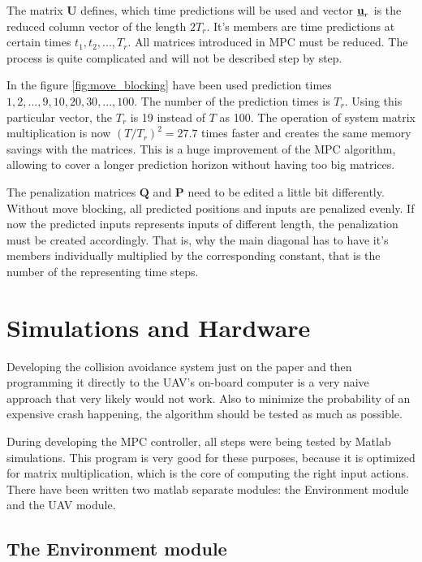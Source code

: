 \documentclass{article}
\newcommand{\urvec}{\textbf{\underline{u}}_r}
\newcommand{\macU}{\textbf{U}}
\begin{document}
The matrix $\macU$ defines, which time predictions will be used and vector $\urvec$ is the reduced column vector of the length $2T_r$. It's members are time predictions at certain times $t_1, t_2, ..., T_r$. All matrices introduced in MPC must be reduced. The process is quite complicated and will not be described step by step. 

In the figure \ref{fig:move_blocking} have been used prediction times $1, 2, ..., 9, 10, 20, 30, ..., 100$. The number of the prediction times is $T_r$. Using this particular vector, the $T_r$ is 19 instead of $T$ as 100. The operation of system matrix multiplication is now $(T/T_r)^2 = 27.7$ times faster and creates the same memory savings with the matrices. This is a huge improvement of the MPC algorithm, allowing to cover a longer prediction horizon without having too big matrices.

The penalization matrices $\textbf{Q}$ and $\textbf{P}$ need to be edited a little bit differently. Without move blocking, all predicted positions and inputs are penalized evenly. If now the predicted inputs represents inputs of different length, the penalization must be created accordingly. That is, why the main diagonal has to have it's members individually multiplied by the corresponding constant, that is the number of the representing time steps. 


\section{Simulations and Hardware}

Developing the collision avoidance system just on the paper and then programming it directly to the UAV's on-board computer is a very naive approach that very likely would not work. Also to minimize the probability of an expensive crash happening, the algorithm should be tested as much as possible. 

During developing the MPC controller, all steps were being tested by Matlab simulations. This program is very good for these purposes, because it is optimized for matrix multiplication, which is the core of computing the right input actions. There have been written two matlab separate modules: the Environment module and the UAV module. 

\subsection{The Environment module}
\end{document}
